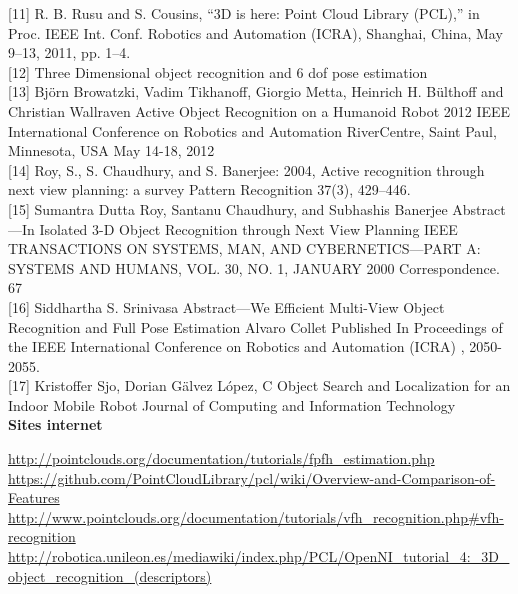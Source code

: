 [11] R. B. Rusu and S. Cousins, “3D is here: Point Cloud Library (PCL),”
in Proc. IEEE Int. Conf. Robotics and Automation (ICRA), Shanghai,
China, May 9–13, 2011, pp. 1–4. \\

[12] Three Dimensional object recognition and 6 dof pose estimation \\ 

[13] Bj\"{o}rn Browatzki, Vadim Tikhanoff, Giorgio Metta, Heinrich H. B\"{u}lthoff and Christian Wallraven 
Active Object Recognition on a Humanoid Robot
2012 IEEE International Conference on Robotics and Automation RiverCentre, Saint Paul, Minnesota, USA May 14-18, 2012 \\

[14] Roy, S., S. Chaudhury, and S. Banerjee: 2004, 
Active recognition through next view planning: a survey
Pattern Recognition 37(3), 429–446. \\

[15] Sumantra Dutta Roy, Santanu Chaudhury, and Subhashis Banerjee Abstract—In
Isolated 3-D Object Recognition through Next View Planning
IEEE TRANSACTIONS ON SYSTEMS, MAN, AND CYBERNETICS—PART A: SYSTEMS AND HUMANS, VOL. 30, NO. 1, JANUARY 2000 Correspondence. 67 \\

[16] Siddhartha S. Srinivasa Abstract—We
Efficient Multi-View Object Recognition and Full Pose Estimation Alvaro Collet
Published In Proceedings of the IEEE International Conference on Robotics and Automation (ICRA) , 2050-2055.\\

[17] Kristoffer Sjo, Dorian G\"{a}lvez López, C
Object Search and Localization for an Indoor Mobile Robot
Journal of Computing and Information Technology \\ %

\textbf{Sites internet}

\url{http://pointclouds.org/documentation/tutorials/fpfh_estimation.php} \\

\url{https://github.com/PointCloudLibrary/pcl/wiki/Overview-and-Comparison-of-Features} \\

\url{http://www.pointclouds.org/documentation/tutorials/vfh_recognition.php#vfh-recognition} \\

\url{http://robotica.unileon.es/mediawiki/index.php/PCL/OpenNI\_tutorial\_4:\_3D\_object\_recognition\_(descriptors)}

